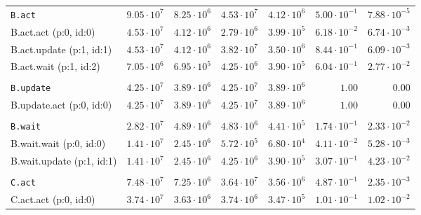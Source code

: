\begin{table}[htbp]
{\begin{tabular}{lrrrrrr}
\\[-8pt]\texttt{B.act}                & $9.05 \cdot 10^{7}$ & $8.25 \cdot 10^{6}$ & $4.53 \cdot 10^{7}$ & $4.12 \cdot 10^{6}$ & $5.00 \cdot 10^{-1}$ & $7.88 \cdot 10^{-5}$ \\
\hspace{3mm}B.act.act (p:0, id:0)     & $4.53 \cdot 10^{7}$ & $4.12 \cdot 10^{6}$ & $2.79 \cdot 10^{6}$ & $3.99 \cdot 10^{5}$ & $6.18 \cdot 10^{-2}$ & $6.74 \cdot 10^{-3}$ \\
\hspace{3mm}B.act.update (p:1, id:1)  & $4.53 \cdot 10^{7}$ & $4.12 \cdot 10^{6}$ & $3.82 \cdot 10^{7}$ & $3.50 \cdot 10^{6}$ & $8.44 \cdot 10^{-1}$ & $6.09 \cdot 10^{-3}$ \\
\hspace{3mm}B.act.wait (p:1, id:2)    & $7.05 \cdot 10^{6}$ & $6.95 \cdot 10^{5}$ & $4.25 \cdot 10^{6}$ & $3.90 \cdot 10^{5}$ & $6.04 \cdot 10^{-1}$ & $2.77 \cdot 10^{-2}$ \\
\\[-8pt]\texttt{B.update}             & $4.25 \cdot 10^{7}$ & $3.89 \cdot 10^{6}$ & $4.25 \cdot 10^{7}$ & $3.89 \cdot 10^{6}$ &               $1.00$ &               $0.00$ \\
\hspace{3mm}B.update.act (p:0, id:0)  & $4.25 \cdot 10^{7}$ & $3.89 \cdot 10^{6}$ & $4.25 \cdot 10^{7}$ & $3.89 \cdot 10^{6}$ &               $1.00$ &               $0.00$ \\
\\[-8pt]\texttt{B.wait}               & $2.82 \cdot 10^{7}$ & $4.89 \cdot 10^{6}$ & $4.83 \cdot 10^{6}$ & $4.41 \cdot 10^{5}$ & $1.74 \cdot 10^{-1}$ & $2.33 \cdot 10^{-2}$ \\
\hspace{3mm}B.wait.wait (p:0, id:0)   & $1.41 \cdot 10^{7}$ & $2.45 \cdot 10^{6}$ & $5.72 \cdot 10^{5}$ & $6.80 \cdot 10^{4}$ & $4.11 \cdot 10^{-2}$ & $5.28 \cdot 10^{-3}$ \\
\hspace{3mm}B.wait.update (p:1, id:1) & $1.41 \cdot 10^{7}$ & $2.45 \cdot 10^{6}$ & $4.25 \cdot 10^{6}$ & $3.90 \cdot 10^{5}$ & $3.07 \cdot 10^{-1}$ & $4.23 \cdot 10^{-2}$ \\
\\[-8pt]\texttt{C.act}                & $7.48 \cdot 10^{7}$ & $7.25 \cdot 10^{6}$ & $3.64 \cdot 10^{7}$ & $3.56 \cdot 10^{6}$ & $4.87 \cdot 10^{-1}$ & $2.35 \cdot 10^{-3}$ \\
\hspace{3mm}C.act.act (p:0, id:0)     & $3.74 \cdot 10^{7}$ & $3.63 \cdot 10^{6}$ & $3.74 \cdot 10^{6}$ & $3.47 \cdot 10^{5}$ & $1.01 \cdot 10^{-1}$ & $1.02 \cdot 10^{-2}$ \\

\end{tabular}}
\end{table}
